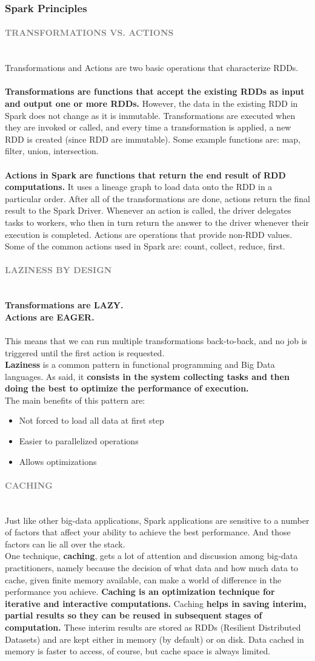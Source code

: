 \documentclass[10pt,a4paper]{article}
\newcommand{\nline}{\\~\\}
\newcommand{\myparagraph}[1]{\paragraph{\normalsize{\textcolor{gray}{\uppercase{\textbf{#1}}}} }\mbox{} \vspace{0.5em}\\}
\begin{document}
\subsubsection{Spark Principles}
\myparagraph{Transformations vs. Actions}
Transformations and Actions are two basic operations that characterize RDDs. \nline
\textbf{Transformations are functions that accept the existing RDDs as input and output one or more RDDs.} However, the data in the existing RDD in Spark does not change as it is immutable. Transformations are executed when they are invoked or called, and every time a transformation is applied, a new RDD is created (since RDD are immutable).
Some example functions are: map, filter, union, intersection.
\nline
\textbf{Actions in Spark are functions that return the end result of RDD computations.} It uses a lineage graph to load data onto the RDD in a particular order. After all of the transformations are done, actions return the final result to the Spark Driver. Whenever an action is called, the driver delegates tasks to workers, who then in turn return the answer to the driver whenever their execution is completed.
Actions are operations that provide non-RDD values. Some of the common actions used in Spark are: count, collect, reduce, first.
\myparagraph{Laziness by Design}
\textbf{Transformations are LAZY.} \\
\textbf{Actions are EAGER. }
\nline
This means that we can run multiple transformations back-to-back, and no job is triggered until the first action is requested. \\
\textbf{Laziness} is a common pattern in functional programming and Big Data languages. As said, it \textbf{consists in the system collecting tasks and then doing the best to optimize the performance of execution. } \\
The main benefits of this pattern are:
\begin{itemize}
	\item Not forced to load all data at first step
	\item Easier to parallelized operations
	\item Allows optimizations
\end{itemize}
\myparagraph{Caching}
Just like other big-data applications, Spark applications are sensitive to a number of factors that affect your ability to achieve the best performance.  And those factors can lie all over the stack.  \\
One technique, \textbf{caching}, gets a lot of attention and discussion among big-data practitioners, namely because the decision of what data and how much data to cache, given finite memory available, can make a world of difference in the performance you achieve. 
\textbf{Caching is an optimization technique for iterative and interactive computations.} Caching \textbf{helps in saving interim, partial results so they can be reused in subsequent stages of computation.} These interim results are stored as RDDs (Resilient Distributed Datasets) and are kept either in memory (by default) or on disk.  Data cached in memory is faster to access, of course, but cache space is always limited.
\end{document}
